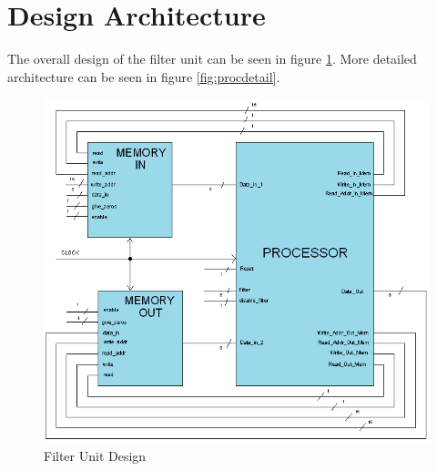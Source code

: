 \documentclass[11pt,a4paper]{article}
\begin{document}
\section{Design Architecture}
\label{sec:design}
The overall design of the filter unit can be seen in figure \ref{fig:proc}. More detailed architecture can be seen in figure \ref{fig:procdetail}.

\begin{figure}[h]
	\centering
		\includegraphics[width=6in]{./images/processador.PNG}
	\caption{Filter Unit Design}	\label{fig:proc}
\end{figure}
\end{document}

